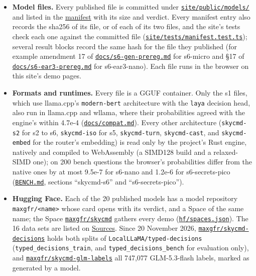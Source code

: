 \documentclass[10pt]{article}
\begin{document}
\begin{itemize}
\item \textbf{Model files.} Every published file is committed under \href{https://github.com/maxgfr/skycmd/tree/main/site/public/models}{\texttt{site/\allowbreak{}public/\allowbreak{}models/\allowbreak{}}} and listed in the \href{https://maxgfr.github.io/skycmd/models/manifest.json}{manifest} with its size and verdict. Every manifest entry also records the sha256 of its file, or of each of its two files, and the site's tests check each one against the committed file (\href{https://github.com/maxgfr/skycmd/blob/main/site/tests/manifest.test.ts}{\texttt{site/\allowbreak{}tests/\allowbreak{}manifest.test.ts}}); several result blocks record the same hash for the file they published (for example amendment 17 of \href{https://github.com/maxgfr/skycmd/blob/main/docs/s6-gen-prereg.md}{\texttt{docs/\allowbreak{}s6-gen-prereg.md}} for s6-micro and \S{}17 of \href{https://github.com/maxgfr/skycmd/blob/main/docs/s6-ear3-prereg.md}{\texttt{docs/\allowbreak{}s6-ear3-prereg.md}} for s6-ear3-nano). Each file runs in the browser on this site's demo pages.
\item \textbf{Formats and runtimes.} Every file is a GGUF container. Only the s1 files, which use llama.cpp's \texttt{modern-bert} architecture with the \texttt{laya} decision head, also run in llama.cpp and wllama, where their probabilities agreed with the engine's within 4.7e-4 (\href{https://github.com/maxgfr/skycmd/blob/main/docs/compat.md}{\texttt{docs/\allowbreak{}compat.md}}). Every other architecture (\texttt{skycmd-s2} for s2 to s6, \texttt{skycmd-iso} for s5, \texttt{skycmd-turn}, \texttt{skycmd-cast}, and \texttt{skycmd-embed} for the router's embedding) is read only by the project's Rust engine, natively and compiled to WebAssembly (a SIMD128 build and a relaxed-SIMD one); on 200 bench questions the browser's probabilities differ from the native ones by at most 9.5e-7 for s6-nano and 1.2e-6 for s6-secrets-pico (\href{https://github.com/maxgfr/skycmd/blob/main/BENCH.md}{\texttt{BENCH.md}}, sections ``skycmd-s6'' and ``s6-secrets-pico'').
\item \textbf{Hugging Face.} Each of the 20 published models has a model repository \texttt{maxgfr/\allowbreak{}<name>} whose card opens with its verdict, and a Space of the same name; the Space \href{https://huggingface.co/spaces/maxgfr/skycmd}{\texttt{maxgfr/\allowbreak{}skycmd}} gathers every demo (\href{https://github.com/maxgfr/skycmd/blob/main/hf/spaces.json}{\texttt{hf/\allowbreak{}spaces.json}}). The 16 data sets are listed on \href{https://maxgfr.github.io/skycmd/sources/\#our-datasets-on-hugging-face}{Sources}. Since 20 November 2026, \href{https://huggingface.co/datasets/maxgfr/skycmd-decisions}{\texttt{maxgfr/\allowbreak{}skycmd-decisions}} holds both splits of \texttt{LocalLLaMA/\allowbreak{}typed-decisions} (\texttt{typed\_\allowbreak{}decisions\_\allowbreak{}train}, and \texttt{typed\_\allowbreak{}decisions\_\allowbreak{}bench} for evaluation only), and \href{https://huggingface.co/datasets/maxgfr/skycmd-glm-labels}{\texttt{maxgfr/\allowbreak{}skycmd-glm-labels}} all 747,077 GLM-5.3-flash labels, marked as generated by a model.

\end{itemize}
\end{document}

